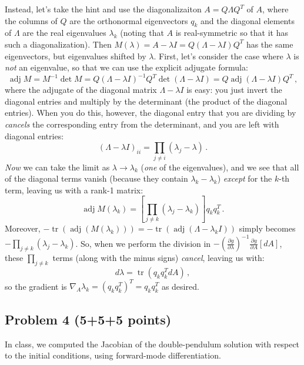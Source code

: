 \documentclass[10pt,oneside]{article}
\newcommand{\tr}{\operatorname{tr}}
\newcommand{\adj}{\operatorname{adj}}
\begin{document}
Instead, let's take the hint and use the diagonalizaiton $A = Q \Lambda Q^T$ of $A$, where the columns of $Q$ are the orthonormal eigenvectors $q_k$ and the diagonal elements of $\Lambda$ are the real eigenvalues $\lambda_k$ (noting that $A$ is real-symmetric so that it has such a diagonalization).   Then $M(\lambda) = A - \lambda I = Q (\Lambda - \lambda I) Q^T$ has the same eigenvectors, but eigenvalues shifted by $\lambda$.  First, let's consider the case where $\lambda$ is \emph{not} an eigenvalue, so that we can use the explicit adjugate formula:
$$
\adj M = M^{-1} \det M = Q (\Lambda - \lambda I)^{-1} Q^T \det(\Lambda - \lambda I) = Q \adj(\Lambda - \lambda I) Q^T \, ,
$$
where the adjugate of the diagonal matrix $\Lambda - \lambda I$ is easy: you just invert the diagonal entries and multiply by the determinant (the product of the diagonal entries).  When you do this, however, the diagonal entry that you are dividing by \emph{cancels} the corresponding entry from the determinant, and you are left with diagonal entries:
$$
(\Lambda - \lambda I)_{ii} = \prod_{j \ne i} (\lambda_j - \lambda) \, .
$$
\emph{Now} we can take the limit as $\lambda \to \lambda_k$ (\emph{one} of the eigenvalues), and we see that all of the diagonal terms vanish (because they contain $\lambda_k - \lambda_k$) \emph{except} for the $k$-th term, leaving us with a rank-1 matrix:
$$
\adj M(\lambda_k) = \left[ \prod_{j \ne k} (\lambda_j - \lambda_k) \right] q_k q_k^T \, .
$$
Moreover, $-\tr(\adj(M(\lambda_k))) = -\tr(\adj(\Lambda - \lambda_k I))$ simply becomes $-\prod_{j \ne k} (\lambda_j - \lambda_k)$.  So, when we perform the division in $-\left(\frac{\partial g}{\partial \lambda}\right)^{-1} \frac{\partial g}{\partial A}[dA]$, these  $\prod_{j \ne k}$ terms (along with the minus signs) \emph{cancel}, leaving us with:
$$
d\lambda = \tr( q_k q_k^T dA ) \, ,
$$
so the gradient is $\nabla_A \lambda_k = (q_k q_k^T)^T = q_k q_k^T$ as desired.

\subsection*{Problem 4 (5+5+5 points)}

In class, we computed the Jacobian of the double-pendulum solution with respect to the initial conditions, using forward-mode differentiation.   
\end{document}
